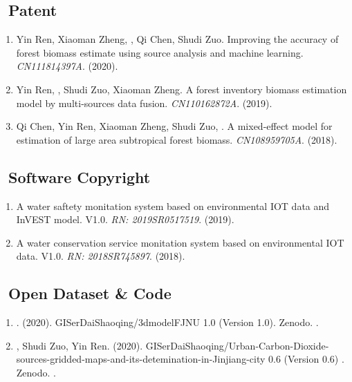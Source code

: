 \subsection*{\texorpdfstring{\faBook\ Patent}{Patent}}
\begin{enumerate}
\item
     Yin Ren, Xiaoman Zheng, \Shaoqing, Qi Chen, Shudi Zuo.
     Improving the accuracy of forest biomass estimate using source analysis and machine learning.
     \textit{CN111814397A}. (2020).
\item
     Yin Ren, \Shaoqing, Shudi Zuo, Xiaoman Zheng.
     A forest inventory biomass estimation model by multi-sources data fusion.
     \textit{CN110162872A}. (2019).
\item
     Qi Chen, Yin Ren, Xiaoman Zheng, Shudi Zuo, \Shaoqing.
     A mixed-effect model for estimation of large area subtropical forest biomass.
     \textit{CN108959705A}. (2018).
\end{enumerate}

\subsection*{\texorpdfstring{\faBook\ Software Copyright}{Software Copyright}}
\begin{enumerate}
\item
    A water saftety monitation system based on environmental IOT data and InVEST model. V1.0.
    \textit{RN: 2019SR0517519}. (2019).
\item
    A water conservation service monitation system based on environmental IOT data. V1.0.
    \textit{RN: 2018SR745897}. (2018).
\end{enumerate}

\subsection*{\texorpdfstring{\faBook\ Open Dataset \& Code}{Open Dataset \& Code}}
\begin{enumerate}
\item
   \Shaoqing. (2020).
    GISerDaiShaoqing/3dmodelFJNU 1.0 (Version 1.0). Zenodo. 
    .
\item
   \Shaoqing, Shudi Zuo, Yin Ren. (2020).
    GISerDaiShaoqing/Urban-Carbon-Dioxide-sources-gridded-maps-and-its-detemination-in-Jinjiang-city 0.6 (Version 0.6) . Zenodo. 
    .
\end{enumerate}

